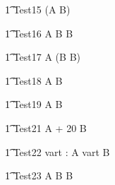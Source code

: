 \begin{circusaction}
   \t1 Test15 \circdef  (A \circseq B) \circendby {} \rcirctime \\
\end{circusaction}

\begin{circusaction}
   \t1 Test16 \circdef  A \circseq B \circendby {} \rcirctime \circseq B \\
\end{circusaction}

\begin{circusaction}
   \t1 Test17 \circdef  A \circseq (B \circendby {} \rcirctime \circseq B)\\
\end{circusaction}

\begin{circusaction}
   \t1 Test18 \circdef  A \circendby {} \rcirctime  \circseq B \circendby {} \rcirctime\\
\end{circusaction}


\begin{circusaction}
   \t1 Test19 \circdef  A \circtimeout {} \rcirctime B  \\
\end{circusaction}



\begin{circusaction}
   \t1 Test21 \circdef  A \circtimeout {} + 20 \rcirctime B  \\
\end{circusaction}

\begin{circusaction}
   \t1 Test22 \circdef \circvres vart : \nat  \circspot  A \circtimeout \lcirctime vart \rcirctime B \\
\end{circusaction}


\begin{circusaction}
   \t1 Test23 \circdef  A \circseq B \circtimeout {} \rcirctime B  \\
\end{circusaction}

